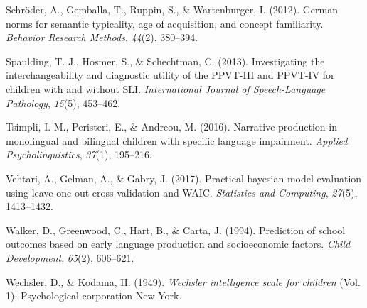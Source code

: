 \documentclass[
  man,floatsintext]{apa6}
\newlength{\cslhangindent}
\newlength{\cslentryspacingunit} %
\newenvironment{CSLReferences}[2] %
 {%
  \setlength{\parindent}{0pt}
  \ifodd #1
  \let\oldpar\par
  \def\par{\hangindent=\cslhangindent\oldpar}
  \fi
  \setlength{\parskip}{#2\cslentryspacingunit}
 }%
 {}
\begin{document}
\begin{CSLReferences}{1}{0}
\leavevmode{}%
Schröder, A., Gemballa, T., Ruppin, S., \& Wartenburger, I. (2012). German norms for semantic typicality, age of acquisition, and concept familiarity. \emph{Behavior Research Methods}, \emph{44}(2), 380--394.

\leavevmode{}%
Spaulding, T. J., Hosmer, S., \& Schechtman, C. (2013). Investigating the interchangeability and diagnostic utility of the PPVT-III and PPVT-IV for children with and without SLI. \emph{International Journal of Speech-Language Pathology}, \emph{15}(5), 453--462.

\leavevmode{}%
Tsimpli, I. M., Peristeri, E., \& Andreou, M. (2016). Narrative production in monolingual and bilingual children with specific language impairment. \emph{Applied Psycholinguistics}, \emph{37}(1), 195--216.

\leavevmode{}%
Vehtari, A., Gelman, A., \& Gabry, J. (2017). Practical bayesian model evaluation using leave-one-out cross-validation and WAIC. \emph{Statistics and Computing}, \emph{27}(5), 1413--1432.

\leavevmode{}%
Walker, D., Greenwood, C., Hart, B., \& Carta, J. (1994). Prediction of school outcomes based on early language production and socioeconomic factors. \emph{Child Development}, \emph{65}(2), 606--621.

\leavevmode{}%
Wechsler, D., \& Kodama, H. (1949). \emph{Wechsler intelligence scale for children} (Vol. 1). Psychological corporation New York.

\end{CSLReferences}
\end{document}
